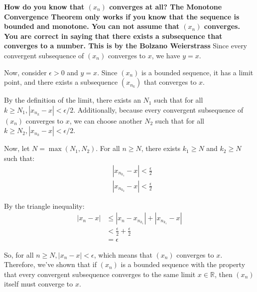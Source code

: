 \documentclass{report}
\begin{document}
\textbf{
How do you know that $(x_n)$ converges at all? The Monotone Convergence Theorem only works if you know that the sequence is bounded and monotone. You can not assume that $(x_n)$ converges. You are correct in saying that there exists a subsequence that converges to a number. This is by the Bolzano Weierstrass
}
Since every convergent subsequence of $\left(x_n\right)$ converges to $x$, we have $y=x$.

Now, consider $\epsilon>0$ and $y=x$. Since $\left(x_n\right)$ is a bounded sequence, it has a limit point, and there exists a subsequence $\left(x_{n_k}\right)$ that converges to $x$.

By the definition of the limit, there exists an $N_1$ such that for all $k \geq N_1,\left|x_{n_{k}}-x\right|<\epsilon / 2$.
Additionally, because every convergent subsequence of $\left(x_n\right)$ converges to $x$, we can choose another $N_2$ such that for all $k \geq N_2,\left|x_{n_k}-x\right|<\epsilon / 2$.

Now, let $N=\max \left(N_1, N_2\right)$. For all $n \geq N$, there exists $k_1 \geq N$ and $k_2 \geq N$ such that:
$$
\begin{aligned}
& \left|x_{n_{k_1}}-x\right|<\frac{\epsilon}{2} \\
& \left|x_{n_{k_2}}-x\right|<\frac{\epsilon}{2}
\end{aligned}
$$

By the triangle inequality:
$$
\begin{aligned}
\left|x_n-x\right| & \leq\left|x_n-x_{n_{k_1}}\right|+\left|x_{n_{k_1}}-x\right| \\
& <\frac{\epsilon}{2}+\frac{\epsilon}{2} \\
& =\epsilon
\end{aligned}
$$

So, for all $n \geq N,\left|x_n-x\right|<\epsilon$, which means that $\left(x_n\right)$ converges to $x$.
Therefore, we've shown that if $\left(x_n\right)$ is a bounded sequence with the property that every convergent subsequence converges to the same limit $x \in \mathbb{R}$, then $\left(x_n\right)$ itself must converge to $x$.
\end{document}
